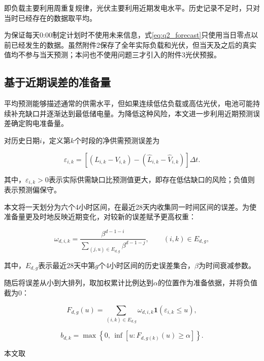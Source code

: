 即负载主要利用周重复规律，光伏主要利用近期发电水平。历史记录不足时，只对当时已经存在的数据取平均。

为保证每天0:00制定计划时不使用未来信息，式\eqref{eq:q2_forecast}只使用当日零点以前已经发生的数据。虽然附件2保存了全年实际负载和光伏，但当天及之后的真实值均不参与当天预测；本问也不使用问题三才引入的附件3光伏预报。


\subsection{基于近期误差的准备量}

平均预测能够描述通常的供需水平，但如果连续低估负载或高估光伏，电池可能持续补充缺口并逐渐达到最低储电量。为降低这种风险，本文进一步利用近期预测误差确定购电准备量。

对历史日期$i$，定义第$k$个时段的净供需预测误差为

\begin{equation}
\varepsilon_{i,k}
=
\left[
(L_{i,k}-V_{i,k})
-
(\widehat L_{i,k}-\widehat V_{i,k})
\right]\Delta t .
\label{eq:q2_error}
\end{equation}

其中，$\varepsilon_{i,k}>0$表示实际供需缺口比预测值更大，即存在低估缺口的风险；负值则表示预测偏保守。

本文将一天划分为六个4小时区间，在最近28天内收集同一时间区间的误差。为使准备量更及时地反映近期变化，对较新的误差赋予更高权重：

\begin{equation}
\omega_{d,i,k}
=
\frac{\beta^{d-1-i}}
{\displaystyle
\sum_{(j,u)\in E_{d,g}}
\beta^{d-1-j}},
\qquad
(i,k)\in E_{d,g},
\label{eq:q2_weight}
\end{equation}

其中，$E_{d,g}$表示最近28天中第$g$个4小时区间的历史误差集合，$\beta$为时间衰减参数。

随后将误差从小到大排列，取加权累计比例达到$\alpha$的位置作为准备依据，并将负值截为0：

\begin{equation}
F_{d,g}(u)
=
\sum_{(i,k)\in E_{d,g}}
\omega_{d,i,k}
\mathbf{1}
\left(
\varepsilon_{i,k}\leq u
\right),
\label{eq:q2_cdf}
\end{equation}

\begin{equation}
b_{d,k}
=
\max
\left\{
0,\,
\inf
\left[
u:F_{d,g(k)}(u)\geq\alpha
\right]
\right\}.
\label{eq:q2_reserve}
\end{equation}

本文取

